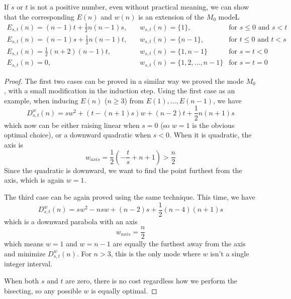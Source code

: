 \documentclass[]{article}
\begin{document}
\vspace{1cm}
\begin{lemma}[Mode $M_0'$] If $s$ or $t$ is not a positive number, even without practical meaning, we can show that the corresponding $E(n)$ and $w(n)$ is an extension of the $M_0$ modeL
	\begin{align*}
		E_{s,t}(n) = (n-1)t + \frac{1}{2}n(n-1)s,\quad & w_{s,t}(n) = \{1\},\quad  &\text{for } s \le 0 \mbox{ and } s < t \\
		E_{s,t}(n) = (n-1)s + \frac{1}{2}n(n-1)t,\quad & w_{s,t}(n) = \{n-1\},\quad  &\text{for } t \le 0 \mbox{ and } t < s \\
		E_{s,t}(n) = \frac{1}{2}(n+2)(n-1)t,\quad & w_{s,t}(n) = \{1, n-1\} &\text{for } s = t < 0\\
		E_{s,t}(n) = 0,\quad& w_{s,t}(n) = \{1, 2, \dots,n-1\} &\text{for } s = t = 0
	\end{align*}
\end{lemma}
\begin{proof}
The first two cases can be proved in a similar way we proved the mode $M_0$, with a small modification in the induction step. Using the first case as an example, when inducing $E(n)$ ($n \ge 3$) from $E(1),\dots,E(n-1)$, we have
\[
D^w_{s,t}(n) = sw^2 + (t-(n+1)s)w + (n-2)t + \frac{1}{2}n(n+1)s
\]
which now can be either raising linear when $s=0$ (so $w=1$ is the obvious optimal choice), or a downward quadratic when $s<0$. When it is quadratic, the axis is
\[
w_{axis}  = \frac{1}{2}\left(-\frac{t}{s} + n+1\right) > \frac{n}{2}
\]
Since the quadratic is downward, we want to find the point furthest from the axis, which is again $w=1$.


The third case can be again proved using the same technique. This time, we have 
\[
D^w_{s,t}(n) = sw^2  -nsw + (n-2)s + \frac{1}{2}(n-4)(n+1)s
\]
which is a downward parabola with an axis
\[
w_{axis} = \frac{n}{2}
\]
which means $w=1$ and $w=n-1$ are equally the furthest away from the axis and minimize $D^w_{s,t}(n)$. For $n > 3$, this is the only mode where $w$ isn't a single integer interval.

When both $s$ and $t$ are zero, there is no cost regardless how we perform the bisecting, so any possible $w$ is equally optimal.
	
\end{proof}
\end{document}
